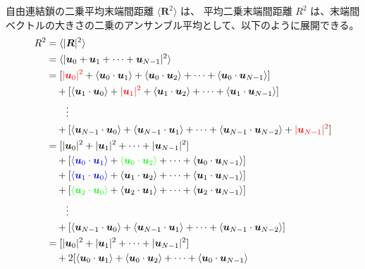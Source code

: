 \documentclass[11pt]{jsarticle}
\begin{document}
\begin{appendix}
自由連結鎖の二乗平均末端間距離 $\langle \bm{R}^2 \rangle$ は、
平均二乗末端間距離 $R^2$ は、末端間ベクトルの大きさの二乗のアンサンブル平均として、以下のように展開できる。
\begin{align*}
	R^2
		&= \langle |\bm{R}|^2 \rangle \notag \\
		&= \langle |\bm{u}_0 + \bm{u}_1 + \cdots + \bm{u}_{N-1}|^2 \rangle \notag \\
		&= 
			[ 
			{\color{red} |\bm{u}_0|^2} + \langle \bm{u}_0 \cdot \bm{u}_1 \rangle + \langle \bm{u}_0 \cdot \bm{u}_2 \rangle + \cdots + \langle \bm{u}_0 \cdot \bm{u}_{N-1} \rangle 
			] \notag \\
		&\quad+ 
			[ 
			\langle \bm{u}_1 \cdot \bm{u}_0 \rangle + {\color{red} |\bm{u}_1|^2} + \langle \bm{u}_1 \cdot \bm{u}_2 \rangle + \cdots + \langle \bm{u}_1 \cdot \bm{u}_{N-1} \rangle 
			] \notag \\
		&\quad\quad \vdots \notag \\
		&\quad+ 
			[ 
			\langle \bm{u}_{N-1} \cdot \bm{u}_0 \rangle + \langle \bm{u}_{N-1} \cdot \bm{u}_1 \rangle + \cdots + \langle \bm{u}_{N-1} \cdot \bm{u}_{N-2} \rangle + {\color{red} |\bm{u}_{N-1}|^2} 
			] \notag \\
		&= 
			[ 
			|\bm{u}_0|^2 +  |\bm{u}_1|^2 + \cdots + |\bm{u}_{N-1}|^2 
			] \notag \\
		&\quad+		
			[
			{\color{blue} \langle \bm{u}_0 \cdot \bm{u}_1 \rangle} + {\color{green} \langle \bm{u}_0 \cdot \bm{u}_2 \rangle} + \cdots + \langle \bm{u}_0 \cdot \bm{u}_{N-1} \rangle 
			] \notag \\
		&\quad+ 
			[ 
			{\color{blue} \langle \bm{u}_1 \cdot \bm{u}_0 \rangle} +\langle \bm{u}_1 \cdot \bm{u}_2 \rangle + \cdots + \langle \bm{u}_1 \cdot \bm{u}_{N-1} \rangle 
			] \notag \\
		&\quad+ 
			[ 
			{\color{green} \langle \bm{u}_2 \cdot \bm{u}_0 \rangle} +\langle \bm{u}_2 \cdot \bm{u}_1 \rangle + \cdots + \langle \bm{u}_2 \cdot \bm{u}_{N-1} \rangle 
			] \notag \\
		&\quad\quad \vdots \notag \\
		&\quad+ 
			[ 
			\langle \bm{u}_{N-1} \cdot \bm{u}_0 \rangle + \langle \bm{u}_{N-1} \cdot \bm{u}_1 \rangle + \cdots + \langle \bm{u}_{N-1} \cdot \bm{u}_{N-2} \rangle
			] \notag \\
		&= 
			[ 
			|\bm{u}_0|^2 +  |\bm{u}_1|^2 + \cdots + |\bm{u}_{N-1}|^2 
			] \notag \\
%
		&\quad+		
			2[
			\langle \bm{u}_0 \cdot \bm{u}_1 \rangle + \langle \bm{u}_0 \cdot \bm{u}_2 \rangle + \cdots + \langle \bm{u}_0 \cdot \bm{u}_{N-1} \rangle 

\end{align*}
\end{appendix}
\end{document}
